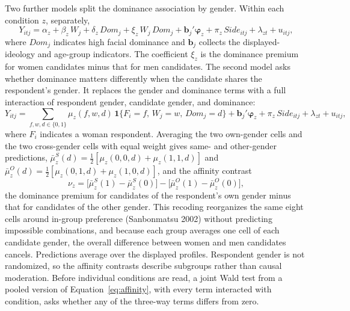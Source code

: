 \documentclass[11pt]{article}\usepackage[]{graphicx}\usepackage[]{xcolor}
\begin{document}
Two further models split the dominance association by gender. Within each condition $z$, separately,
\begin{equation}
Y_{itj}=\alpha_z+\beta_z\,W_j+\delta_z\,\mathit{Dom}_j+\xi_z\,W_j\,\mathit{Dom}_j+\mathbf{b}_j'\boldsymbol{\varphi}_z+\pi_z\,\mathit{Side}_{itj}+\lambda_{zt}+u_{itj},
\label{eq:dominance}
\end{equation}
where $\mathit{Dom}_j$ indicates high facial dominance and $\mathbf{b}_j$ collects the displayed-ideology and age-group indicators. The coefficient $\xi_z$ is the dominance premium for women candidates minus that for men candidates. The second model asks whether dominance matters differently when the candidate shares the respondent's gender. It replaces the gender and dominance terms with a full interaction of respondent gender, candidate gender, and dominance:
\begin{equation}
Y_{itj}=\sum_{f,w,d\in\{0,1\}}\mu_z(f,w,d)\,\mathbf 1\{F_i=f,\,W_j=w,\,\mathit{Dom}_j=d\}+\mathbf{b}_j'\boldsymbol{\varphi}_z+\pi_z\,\mathit{Side}_{itj}+\lambda_{zt}+u_{itj},
\label{eq:affinity}
\end{equation}
where $F_i$ indicates a woman respondent. Averaging the two own-gender cells and the two cross-gender cells with equal weight gives same- and other-gender predictions, $\bar\mu^{S}_z(d)=\tfrac12[\mu_z(0,0,d)+\mu_z(1,1,d)]$ and $\bar\mu^{O}_z(d)=\tfrac12[\mu_z(0,1,d)+\mu_z(1,0,d)]$, and the affinity contrast
\begin{equation}
\nu_z=\bigl[\bar\mu^{S}_z(1)-\bar\mu^{S}_z(0)\bigr]-\bigl[\bar\mu^{O}_z(1)-\bar\mu^{O}_z(0)\bigr],
\label{eq:nu}
\end{equation}
the dominance premium for candidates of the respondent's own gender minus that for candidates of the other gender. This recoding reorganizes the same eight cells around in-group preference (Sanbonmatsu 2002) without predicting impossible combinations, and because each group averages one cell of each candidate gender, the overall difference between women and men candidates cancels. Predictions average over the displayed profiles. Respondent gender is not randomized, so the affinity contrasts describe subgroups rather than causal moderation. Before individual conditions are read, a joint Wald test from a pooled version of Equation~\eqref{eq:affinity}, with every term interacted with condition, asks whether any of the three-way terms differs from zero.
\end{document}
